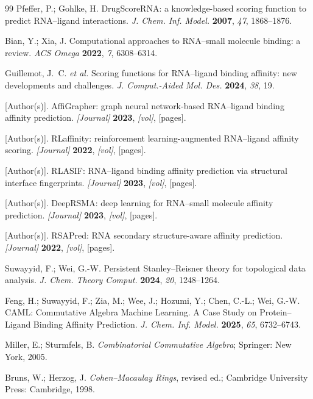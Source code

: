 \documentclass[10pt,twocolumn]{article}
\begin{document}
\begin{thebibliography}{99}
Pfeffer, P.; Gohlke, H.
DrugScoreRNA: a knowledge-based scoring function to predict RNA--ligand interactions.
\textit{J. Chem. Inf. Model.} \textbf{2007}, \textit{47}, 1868--1876.

Bian, Y.; Xia, J.
Computational approaches to RNA--small molecule binding: a review.
\textit{ACS Omega} \textbf{2022}, \textit{7}, 6308--6314.

Guillemot, J.~C. \textit{et al.}
Scoring functions for RNA--ligand binding affinity: new developments and challenges.
\textit{J. Comput.-Aided Mol. Des.} \textbf{2024}, \textit{38}, 19.

[Author(s)].
AffiGrapher: graph neural network-based RNA--ligand binding affinity prediction.
\textit{[Journal]} \textbf{2023}, \textit{[vol]}, [pages].

[Author(s)].
RLaffinity: reinforcement learning-augmented RNA--ligand affinity scoring.
\textit{[Journal]} \textbf{2022}, \textit{[vol]}, [pages].

[Author(s)].
RLASIF: RNA--ligand binding affinity prediction via structural interface fingerprints.
\textit{[Journal]} \textbf{2023}, \textit{[vol]}, [pages].

[Author(s)].
DeepRSMA: deep learning for RNA--small molecule affinity prediction.
\textit{[Journal]} \textbf{2023}, \textit{[vol]}, [pages].

[Author(s)].
RSAPred: RNA secondary structure-aware affinity prediction.
\textit{[Journal]} \textbf{2022}, \textit{[vol]}, [pages].

Suwayyid, F.; Wei, G.-W.
Persistent Stanley--Reisner theory for topological data analysis.
\textit{J. Chem. Theory Comput.} \textbf{2024}, \textit{20}, 1248--1264.

Feng, H.; Suwayyid, F.; Zia, M.; Wee, J.; Hozumi, Y.; Chen, C.-L.; Wei, G.-W.
CAML: Commutative Algebra Machine Learning. A Case Study on Protein--Ligand
Binding Affinity Prediction.
\textit{J. Chem. Inf. Model.} \textbf{2025}, \textit{65}, 6732--6743.

Miller, E.; Sturmfels, B.
\textit{Combinatorial Commutative Algebra}; Springer: New York, 2005.

Bruns, W.; Herzog, J.
\textit{Cohen--Macaulay Rings}, revised ed.; Cambridge University Press: Cambridge, 1998.


\end{thebibliography}
\end{document}

